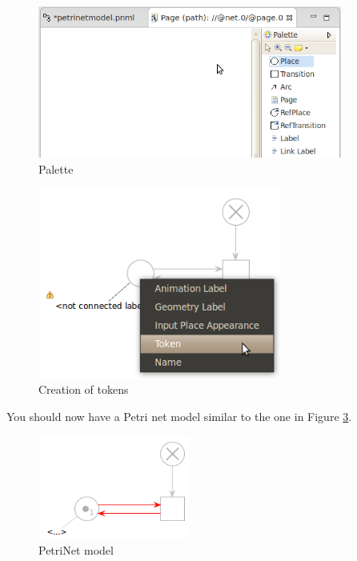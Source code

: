 \begin{figure}[htp]
\begin{center}
  \includegraphics[width=10.0cm]{image/tutorial/Tutorial_03.png}
  \caption{Palette}
  \label{fig:tut03}
\end{center}
\end{figure}

\begin{figure}[htp]
\begin{center}
  \includegraphics[width=8.0cm]{image/tutorial/Tutorial_04.png}
  \caption{Creation of tokens}
  \label{fig:tut04}
\end{center}
\end{figure}

\newpage 
You should now have a Petri net model similar to the one in Figure \ref{fig:tut05}.

\begin{figure}[htp]
\begin{center}
  \includegraphics[width=5.0cm]{image/tutorial/Tutorial_05.png}
  \caption{PetriNet model}
  \label{fig:tut05}
\end{center}
\end{figure}

